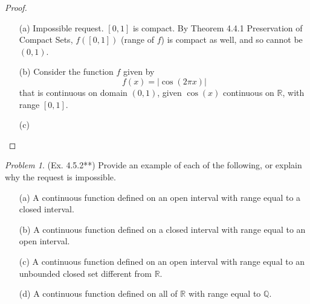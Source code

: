 \documentclass[11pt,twoside, reqno]{amsart}
\theoremstyle{remark}
\newtheorem{Prob}{Problem}
\def\R{\mathbb R}
\def\Q{\mathbb Q}
\begin{document}
\begin{proof}
\begin{enumerate}
    \item [(a)] Impossible request. $[0,1]$ is compact. By Theorem 4.4.1 Preservation of Compact Sets, $f([0,1])$ (range of $f$) is compact as well, and so cannot be $(0,1)$.
    \item [(b)] Consider the function $f$ given by
    $$
        f(x) = |\cos(2\pi x)|    
    $$
    that is continuous on domain $(0,1)$, given $\cos(x)$ continuous on $\R$, with range $[0,1]$.
    \item [(c)] 
\end{enumerate}

\end{proof}

\begin{Prob}(Ex. 4.5.2**) Provide an example of each of the following, or explain why the request is impossible.
\begin{enumerate}
    \item [(a)] A continuous function defined on an open interval with range equal to a closed interval.
    \item [(b)] A continuous function defined on a closed interval with range equal to an open interval.
    \item [(c)] A continuous function defined on an open interval with range equal to an unbounded closed set different from $\R$.
    \item [(d)] A continuous function defined on all of $\R$ with range equal to $\Q$.
\end{enumerate}
\end{Prob}
\end{document}

